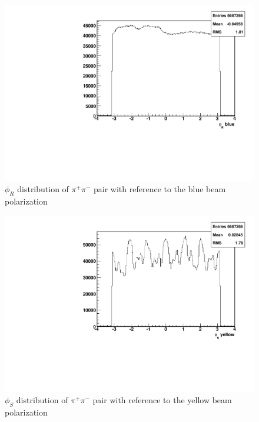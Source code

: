 \documentclass[abstract = on,listof=totoc, bibliography=totoc]{scrreprt}
\newcommand{\phir}{\phi_{R}}
\newcommand{\phis}{\phi_{S}}
\newcommand{\pip}{\pi^+}
\newcommand{\pim}{\pi^-}
\newcommand{\pair}{$\pip\pim$ }
\begin{document}
\begin{figure}
\begin{center}
\includegraphics[width = .8\textwidth]{hPhiRb}
\caption[$\phir$ distribution of \pair pair with reference to the blue beam polarization]{$\phir$ distribution of \pair pair with reference to the blue beam polarization}
\label{fig:phirb}
\end{center}
\end{figure}


\begin{figure}
\begin{center}
\includegraphics[width = .8\textwidth]{hPhiSy}
\caption[$\phis$ distribution of \pair pair with reference to the yellow beam polarization]{$\phis$ distribution of \pair pair with reference to the yellow beam polarization}
\label{fig:phisy}
\end{center}
\end{figure}
\end{document}
